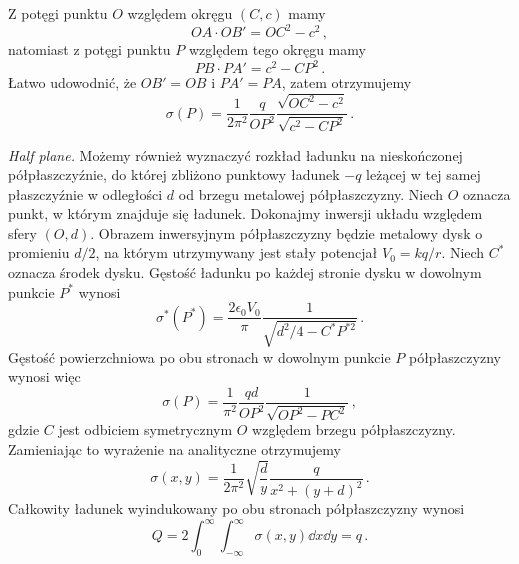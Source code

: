 \documentclass[../main.tex]{subfiles}
\begin{document}
\begin{enumerate}
    Z potęgi punktu \(O\) względem okręgu \((C,c)\) mamy
    \begin{equation*}
        OA\cdot OB'=OC^2-c^2\,,
    \end{equation*}
    natomiast z potęgi punktu \(P\) względem tego okręgu mamy
    \begin{equation*}
        PB\cdot PA'=c^2-CP^2\,.
    \end{equation*}
    Łatwo udowodnić, że \(OB'=OB\) i \(PA'=PA\), zatem otrzymujemy
    \begin{equation*}
        \sigma(P)=\frac{1}{2\pi^2}\frac{q}{OP^2}\frac{\sqrt{OC^2-c^2}}{\sqrt{c^2-CP^2}}\,.
    \end{equation*}
   
   \textit{Half plane.} Możemy również wyznaczyć rozkład ładunku na nieskończonej półpłaszczyźnie, do której zbliżono punktowy ładunek \(-q\) leżącej w tej samej płaszczyźnie w odległości \(d\) od brzegu metalowej półpłaszczyzny. Niech \(O\) oznacza punkt, w którym znajduje się ładunek. Dokonajmy inwersji układu względem sfery \((O,d)\). Obrazem inwersyjnym półpłaszczyzny będzie metalowy dysk o promieniu \(d/2\), na którym utrzymywany jest stały potencjał \(V_0=kq/r\). Niech \(C^*\) oznacza środek dysku. Gęstość ładunku po każdej stronie dysku w dowolnym punkcie \(P^*\) wynosi
    \begin{equation*}
        \sigma^*(P^*)=\frac{2\epsilon_0V_0}{\pi}\frac{1}{\sqrt{d^2/4-C^*P^{*2}}}\,.
    \end{equation*}
    Gęstość powierzchniowa po obu stronach w dowolnym punkcie \(P\) półpłaszczyzny wynosi więc
    \begin{equation*}
        \sigma(P)=\frac{1}{\pi^2}\frac{qd}{OP^2}\frac{1}{\sqrt{OP^2-PC^2}}\,,
    \end{equation*}
    gdzie \(C\) jest odbiciem symetrycznym \(O\) względem brzegu półpłaszczyzny. Zamieniając to wyrażenie na analityczne otrzymujemy
    \begin{equation*}
        \sigma(x,y)=\frac{1}{2\pi^2}\sqrt{\frac{d}{y}}\frac{q}{x^2+(y+d)^2}\,.
    \end{equation*}
    Całkowity ładunek wyindukowany po obu stronach półpłaszczyzny wynosi
    \begin{equation*}
        Q=2\int_0^\infty\int_{-\infty}^\infty\sigma(x,y)\dd{x}\dd{y}=q\,.
    \end{equation*}
    \begin{figure}[ht]
        \centering
        \begin{tikzpicture}[line cap=round,line join=round,>=triangle 45,x=1cm,y=1cm,scale=0.2]

\end{tikzpicture}
\end{figure}
\end{enumerate}
\end{document}
